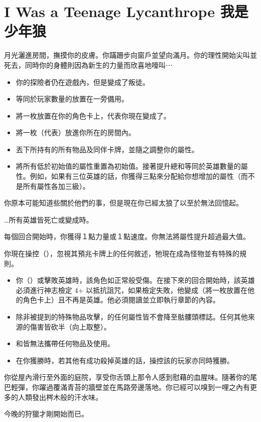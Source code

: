 
\chapter{I Was a Teenage Lycanthrope 我是少年狼}

\begin{HauntStory}
  月光灑進房間，撫摸你的皮膚。你蹣跚步向窗戶並望向滿月。你的理性開始尖叫並死去，同時你的身體則因為新生的力量而欣喜地嚎叫⋯
\end{HauntStory}

\vspace*{-1em}
\begin{itemize}
  \item 你的探險者仍在遊戲內，但是變成了叛徒。
  \item 等同於玩家數量的放置在一旁備用。
  \item 將一枚放置在你的角色卡上，代表你現在變成了。
  \item 將一枚（代表）放進你所在的房間內。
  \item 丟下所持有的所有物品及同伴卡牌，並隨之調整你的屬性。
  \item 將所有低於初始值的屬性重置為初始值。接著提升總和等同於英雄數量的屬性。例如，如果有三位英雄的話，你獲得三點來分配給你想增加的屬性（而不是所有屬性各加三級）。
\end{itemize}

你原本可能知道些關於他們的事，但是現在你已經太狼了以至於無法回憶起。

…所有英雄皆死亡或變成時。

每個回合開始時，你獲得１點力量或１點速度。你無法將屬性提升超過最大值。

\vfill\null\pagebreak


你現在操控（），忽視其預兆卡牌上的任何敘述，牠現在成為怪物並有特殊的規則。

\vspace*{-1em}
\begin{itemize}
  \item 你（）或擊敗英雄時，該角色如正常般受傷。在接下來的回合開始時，該英雄必須進行神志檢定 4+ 以抵抗詛咒，如果檢定失敗，他變成（將一枚放置在他的角色卡上）且不再是英雄。他必須閱讀並立即執行章節的內容。
  \item 除非被提到的特殊物品攻擊，的任何屬性皆不會降至骷髏頭標誌。任何其他來源的傷害皆砍半（向上取整）。
  \item {}和皆無法攜帶任何物品及使用。
  \item 在你獲勝時，若其他有成功殺掉英雄的話，操控該的玩家亦同時獲勝。
\end{itemize}

\begin{HauntStory}
  你從屋內滑行至外面的庭院，享受你舌頭上那令人感到慰藉的血腥味。隨著你的尾巴輕彈，你躍過覆滿青苔的牆壁並在馬路旁邊落地。你已經可以嗅到一哩之內有更多的人類發出梣木般的汗水味。

  今晚的狩獵才剛開始而已。
\end{HauntStory}
